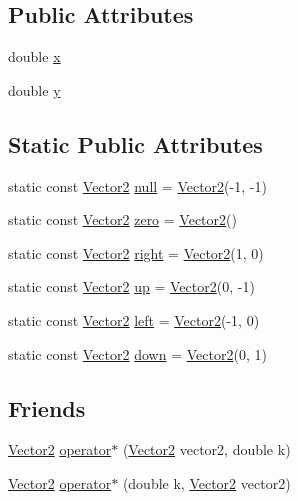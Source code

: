 \subsection*{Public Attributes}
\begin{DoxyCompactItemize}
\item 
double \mbox{\hyperlink{struct_vector2_a61d73d9036ccbb3257fbe595c014a1d0}{x}}
\item 
double \mbox{\hyperlink{struct_vector2_a4df9b2a8e79e6e30a7a3b34722d8b8b8}{y}}
\end{DoxyCompactItemize}
\subsection*{Static Public Attributes}
\begin{DoxyCompactItemize}
\item 
static const \mbox{\hyperlink{struct_vector2}{Vector2}} \mbox{\hyperlink{struct_vector2_a2c6e0149051082f87c4f63f97e07c7ae}{null}} = \mbox{\hyperlink{struct_vector2}{Vector2}}(-\/1, -\/1)
\item 
static const \mbox{\hyperlink{struct_vector2}{Vector2}} \mbox{\hyperlink{struct_vector2_a28849e17f54c1c995f035544b5fd0a5f}{zero}} = \mbox{\hyperlink{struct_vector2}{Vector2}}()
\item 
static const \mbox{\hyperlink{struct_vector2}{Vector2}} \mbox{\hyperlink{struct_vector2_aa9712253176cedb918592990df5ea611}{right}} = \mbox{\hyperlink{struct_vector2}{Vector2}}(1, 0)
\item 
static const \mbox{\hyperlink{struct_vector2}{Vector2}} \mbox{\hyperlink{struct_vector2_a0de964f9acb5cc8669d0b3b9f5b9d4eb}{up}} = \mbox{\hyperlink{struct_vector2}{Vector2}}(0, -\/1)
\item 
static const \mbox{\hyperlink{struct_vector2}{Vector2}} \mbox{\hyperlink{struct_vector2_aaad26bbee0364de1e6a8676215886a2f}{left}} = \mbox{\hyperlink{struct_vector2}{Vector2}}(-\/1, 0)
\item 
static const \mbox{\hyperlink{struct_vector2}{Vector2}} \mbox{\hyperlink{struct_vector2_a64cb9ddeb42abbcfa527c3e2660ffef9}{down}} = \mbox{\hyperlink{struct_vector2}{Vector2}}(0, 1)
\end{DoxyCompactItemize}
\subsection*{Friends}
\begin{DoxyCompactItemize}
\item 
\mbox{\hyperlink{struct_vector2}{Vector2}} \mbox{\hyperlink{struct_vector2_a489f5283f5f1dc905c57d0a40d98c1af}{operator$\ast$}} (\mbox{\hyperlink{struct_vector2}{Vector2}} vector2, double k)
\item 
\mbox{\hyperlink{struct_vector2}{Vector2}} \mbox{\hyperlink{struct_vector2_a6ac6360b23e2a1457b794f0aefc18f3a}{operator$\ast$}} (double k, \mbox{\hyperlink{struct_vector2}{Vector2}} vector2)
\end{DoxyCompactItemize}


